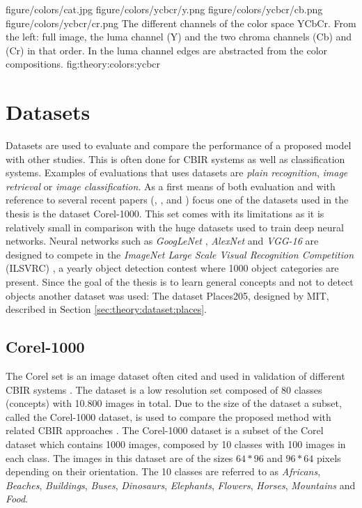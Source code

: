 \fourfigure
{figure/colors/cat.jpg}
{figure/colors/ycbcr/y.png}
{figure/colors/ycbcr/cb.png}
{figure/colors/ycbcr/cr.png}
{The different channels of the color space YCbCr. From the left: full image, the luma channel (Y) and the two chroma channels (Cb) and (Cr) in that order. In the luma channel edges are abstracted from the color compositions.}
{fig:theory:colors:ycbcr} 


\section{Datasets}
\label{sec:theory:datasets}
Datasets are used to evaluate and compare the performance of a proposed model with other studies. This is often done for CBIR systems as well as classification systems.
Examples of evaluations that uses datasets are \emph{plain recognition}, \emph{image retrieval} or \emph{image classification}. 
As a first means of both evaluation and with reference to several recent papers (\cite{wang2001simplicity}, \cite{subrahmanyam2013modified}, \cite{nagaraja2015low} and \cite{elalami2014new}) focus one of the datasets used in the thesis is the dataset Corel-1000. 
This set comes with its limitations as it is relatively small in comparison with the huge datasets used to train deep neural networks. Neural networks such as \emph{GoogLeNet} \cite{szegedy2015going}, \emph{AlexNet} \cite{krizhevsky2012imagenet} and \emph{VGG-16} \cite{simonyan2014very} are designed to compete in the \emph{ImageNet Large Scale Visual Recognition Competition} (ILSVRC) \cite{russakovsky2015imagenet}, a yearly object detection contest where 1000 object categories are present. Since the goal of the thesis is to learn general concepts and not to detect objects another dataset was used: The dataset Places205, designed by MIT, described in Section \ref{sec:theory:dataset:places}.   


\subsection{Corel-1000}
\label{sec:corel}
The Corel set is an image dataset often cited and used in validation of different CBIR systems \cite{coreldataset2017}. The dataset is a low resolution set composed of 80 classes (concepts) with 10.800 images in total. Due to the size of the dataset a subset, called the Corel-1000 dataset, is used to compare the proposed method with related CBIR approaches \cite{wang2001simplicity}. The Corel-1000 dataset is a subset of the Corel dataset which contains 1000 images, composed by 10 classes with 100 images in each class. The images in this dataset are of the sizes $64*96$ and $96*64$ pixels depending on their orientation. The 10 classes are referred to as \emph{Africans}, \emph{Beaches}, \emph{Buildings}, \emph{Buses}, \emph{Dinosaurs}, \emph{Elephants}, \emph{Flowers}, \emph{Horses}, \emph{Mountains} and \emph{Food}. 

